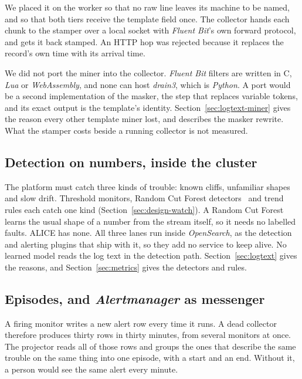 We placed it on the worker so that no raw line leaves its machine to be named, and so that both tiers receive the template field once. The collector hands each chunk to the stamper over a local socket with \textit{Fluent Bit}'s own forward protocol, and gets it back stamped. An HTTP hop was rejected because it replaces the record's own time with its arrival time.

We did not port the miner into the collector. \textit{Fluent Bit} filters are written in C, \textit{Lua} or \textit{WebAssembly}, and none can host \textit{drain3}, which is \textit{Python}. A port would be a second implementation of the masker, the step that replaces variable tokens, and its exact output is the template's identity. Section~\ref{sec:logtext-miner} gives the reason every other template miner lost, and describes the masker rewrite. What the stamper costs beside a running collector is not measured.

\subsection{Detection on numbers, inside the cluster}\label{sec:why-detection}

The platform must catch three kinds of trouble: known cliffs, unfamiliar shapes and slow drift. Threshold monitors, Random Cut Forest detectors~\cite{ref:rcf} and trend rules each catch one kind (Section~\ref{sec:design-watch}). A Random Cut Forest learns the usual shape of a number from the stream itself, so it needs no labelled faults. ALICE has none. All three lanes run inside \textit{OpenSearch}, as the detection and alerting plugins that ship with it, so they add no service to keep alive. No learned model reads the log text in the detection path. Section~\ref{sec:logtext} gives the reasons, and Section~\ref{sec:metrics} gives the detectors and rules.

\subsection{Episodes, and \textit{Alertmanager} as messenger}\label{sec:why-episodes}

A firing monitor writes a new alert row every time it runs. A dead collector therefore produces thirty rows in thirty minutes, from several monitors at once. The projector reads all of those rows and groups the ones that describe the same trouble on the same thing into one episode, with a start and an end. Without it, a person would see the same alert every minute.

